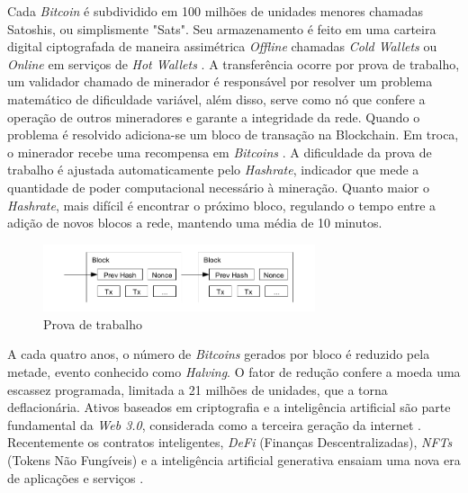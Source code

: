 Cada \textit{Bitcoin} é subdividido em 100 milhões de unidades menores chamadas Satoshis, ou simplismente "Sats".
Seu armazenamento é feito em uma carteira digital ciptografada de maneira assimétrica \textit{Offline} chamadas \textit{Cold Wallets} ou \textit{Online} em serviços de \textit{Hot Wallets} \cite{wallet}.
A transferência ocorre por prova de trabalho, um validador chamado de minerador é responsável por resolver um problema matemático de dificuldade variável, além disso, serve como nó que confere a operação de outros mineradores e garante a integridade da rede.
Quando o problema é resolvido adiciona-se um bloco de transação na Blockchain. Em troca, o minerador recebe uma recompensa em \textit{Bitcoins} \cite{pow}.
A dificuldade da prova de trabalho é ajustada automaticamente pelo \textit{Hashrate}, indicador que mede a quantidade de poder computacional necessário à mineração. Quanto maior o \textit{Hashrate}, mais difícil é encontrar o próximo bloco, regulando o tempo entre a adição de novos blocos a rede, mantendo uma média de 10 minutos.

\begin{figure}[!htb] \centering
    \caption{Prova de trabalho} \label{figura:imageNonce}
    \begin{varwidth}{\linewidth}
      \includegraphics[width=8cm]{figuras/nonce.png}
    \end{varwidth}
  \end{figure}

A cada quatro anos, o número de \textit{Bitcoins} gerados por bloco é reduzido pela metade, evento conhecido como \textit{Halving}.
O fator de redução confere a moeda uma escassez programada, limitada a 21 milhões de unidades, que a torna deflacionária.
Ativos baseados em criptografia e a inteligência artificial são parte fundamental da \textit{Web 3.0}, considerada como a terceira geração da internet \cite{web3}.
Recentemente os contratos inteligentes, \textit{DeFi} (Finanças Descentralizadas), \textit{NFTs} (Tokens Não Fungíveis) e a inteligência artificial generativa ensaiam uma nova era de aplicações e serviços \cite{books}.

